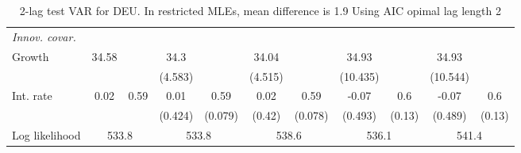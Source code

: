 \begin{table}[htbp]
\begin{tabular}{@{\extracolsep{4pt}}lcccccccccc@{}}
\rule{0pt}{4ex} \emph{Innov. covar.}  	 & 	 & 	 & 	 & 	 & 	 & 	 & 	 & 	 & 	 &\\ 
\quad Growth 	 &34.58 	 &  	 & 34.3 	 &  	 & 34.04 	 &  	 & 34.93 	 &  	 & 34.93 	 & 	 \\ 
 		 &  	 &  	 & (4.583) 	 &  	 & (4.515) 	 &  	 & (10.435) 	 &  	 & (10.544) 	 &  	 \\ 
\quad Int. rate 	 &0.02 	 & 0.59 	 & 0.01 	 & 0.59 	 & 0.02 	 & 0.59 	 & -0.07 	 & 0.6 	 & -0.07 	 & 0.6	 \\ 
 		 &  	 &  	 & (0.424) 	 & (0.079) 	 & (0.42) 	 & (0.078) 	 & (0.493) 	 & (0.13) 	 & (0.489) 	 & (0.13) 	 \\ 
 \hline \rule{0pt}{4ex} 
  Log likelihood 	 &\multicolumn{2}{c}{533.8} 	 & \multicolumn{2}{c}{533.8} 	 & \multicolumn{2}{c}{538.6} 	 & \multicolumn{2}{c}{536.1} 	 & \multicolumn{2}{c}{541.4}\\ 

 \hline 	\end{tabular}		\caption{2-lag test VAR for DEU. In restricted MLEs, mean difference is 1.9 Using AIC opimal lag length 2}
		\label{tab:DEUopt_}

\end{table}